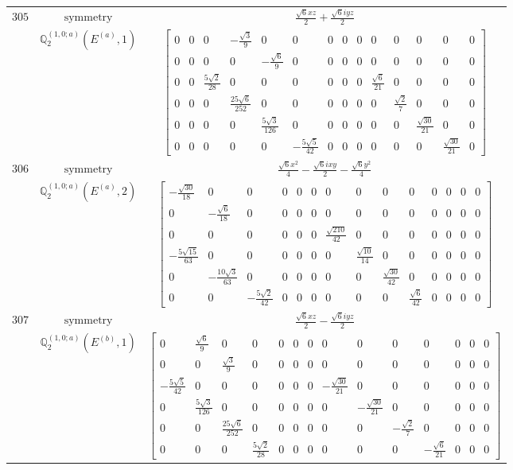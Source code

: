 \documentclass[fleqn,8pt,landscape]{jsarticle}
\begin{document}
\begin{longtable}{ccc}
$ 305 $ & $ \text{symmetry} $ & $ \frac{\sqrt{6} x z}{2} + \frac{\sqrt{6} i y z}{2} $ \\
$  $ & $ \mathbb{Q}_{2}^{(1,0;a)}(E^{(a)},1) $ & $ \begin{bmatrix} 0 & 0 & 0 & - \frac{\sqrt{3}}{9} & 0 & 0 & 0 & 0 & 0 & 0 & 0 & 0 & 0 & 0 \\ 0 & 0 & 0 & 0 & - \frac{\sqrt{6}}{9} & 0 & 0 & 0 & 0 & 0 & 0 & 0 & 0 & 0 \\ 0 & 0 & \frac{5 \sqrt{2}}{28} & 0 & 0 & 0 & 0 & 0 & 0 & \frac{\sqrt{6}}{21} & 0 & 0 & 0 & 0 \\ 0 & 0 & 0 & \frac{25 \sqrt{6}}{252} & 0 & 0 & 0 & 0 & 0 & 0 & \frac{\sqrt{2}}{7} & 0 & 0 & 0 \\ 0 & 0 & 0 & 0 & \frac{5 \sqrt{3}}{126} & 0 & 0 & 0 & 0 & 0 & 0 & \frac{\sqrt{30}}{21} & 0 & 0 \\ 0 & 0 & 0 & 0 & 0 & - \frac{5 \sqrt{5}}{42} & 0 & 0 & 0 & 0 & 0 & 0 & \frac{\sqrt{30}}{21} & 0 \end{bmatrix} $ \\ \hline
$ 306 $ & $ \text{symmetry} $ & $ \frac{\sqrt{6} x^{2}}{4} - \frac{\sqrt{6} i x y}{2} - \frac{\sqrt{6} y^{2}}{4} $ \\
$  $ & $ \mathbb{Q}_{2}^{(1,0;a)}(E^{(a)},2) $ & $ \begin{bmatrix} - \frac{\sqrt{30}}{18} & 0 & 0 & 0 & 0 & 0 & 0 & 0 & 0 & 0 & 0 & 0 & 0 & 0 \\ 0 & - \frac{\sqrt{6}}{18} & 0 & 0 & 0 & 0 & 0 & 0 & 0 & 0 & 0 & 0 & 0 & 0 \\ 0 & 0 & 0 & 0 & 0 & 0 & \frac{\sqrt{210}}{42} & 0 & 0 & 0 & 0 & 0 & 0 & 0 \\ - \frac{5 \sqrt{15}}{63} & 0 & 0 & 0 & 0 & 0 & 0 & \frac{\sqrt{10}}{14} & 0 & 0 & 0 & 0 & 0 & 0 \\ 0 & - \frac{10 \sqrt{3}}{63} & 0 & 0 & 0 & 0 & 0 & 0 & \frac{\sqrt{30}}{42} & 0 & 0 & 0 & 0 & 0 \\ 0 & 0 & - \frac{5 \sqrt{2}}{42} & 0 & 0 & 0 & 0 & 0 & 0 & \frac{\sqrt{6}}{42} & 0 & 0 & 0 & 0 \end{bmatrix} $ \\ \hline
$ 307 $ & $ \text{symmetry} $ & $ \frac{\sqrt{6} x z}{2} - \frac{\sqrt{6} i y z}{2} $ \\
$  $ & $ \mathbb{Q}_{2}^{(1,0;a)}(E^{(b)},1) $ & $ \begin{bmatrix} 0 & \frac{\sqrt{6}}{9} & 0 & 0 & 0 & 0 & 0 & 0 & 0 & 0 & 0 & 0 & 0 & 0 \\ 0 & 0 & \frac{\sqrt{3}}{9} & 0 & 0 & 0 & 0 & 0 & 0 & 0 & 0 & 0 & 0 & 0 \\ - \frac{5 \sqrt{5}}{42} & 0 & 0 & 0 & 0 & 0 & 0 & - \frac{\sqrt{30}}{21} & 0 & 0 & 0 & 0 & 0 & 0 \\ 0 & \frac{5 \sqrt{3}}{126} & 0 & 0 & 0 & 0 & 0 & 0 & - \frac{\sqrt{30}}{21} & 0 & 0 & 0 & 0 & 0 \\ 0 & 0 & \frac{25 \sqrt{6}}{252} & 0 & 0 & 0 & 0 & 0 & 0 & - \frac{\sqrt{2}}{7} & 0 & 0 & 0 & 0 \\ 0 & 0 & 0 & \frac{5 \sqrt{2}}{28} & 0 & 0 & 0 & 0 & 0 & 0 & - \frac{\sqrt{6}}{21} & 0 & 0 & 0 \end{bmatrix} $ \\ \hline

\end{longtable}
\end{document}
